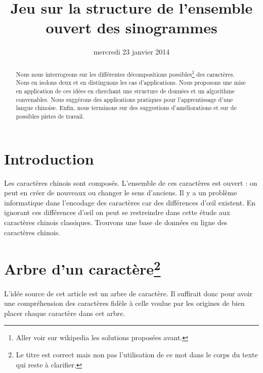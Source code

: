 \documentclass[12pt,onecolumn]{article} %
\title{Jeu sur la structure de l'ensemble ouvert des sinogrammes}
\author{}
\date{mercredi 23 janvier 2014}
\begin{document}
\maketitle

\begin{abstract}\par Nous nous interrogeons sur les différentes décompositions possibles\footnote{Aller voir sur wikipedia les solutions proposées avant.} des caractères. Nous en isolons deux et en distinguons les cas d'applications. Nous proposons une mise en application de ces idées en cherchant une structure de données et un algorithme convenables. Nous suggérons des applications pratiques pour l'apprentissage d'une langue chinoise. Enfin, nous terminons sur des suggestions d'améliorations et sur de possibles pistes de travail.
\end{abstract}

\tableofcontents

\section{Introduction}
Les caractères chinois sont composés. L'ensemble de ces caractères est ouvert : on peut en créer de nouveaux ou changer le sens d'anciens.
Il y a un problème informatique dans l'encodage des caractères car des différences d'œil existent. En ignorant ces différences d'œil on peut se restreindre dans cette étude aux caractères chinois classiques. Trouvons une base de données en ligne des caractères chinois.

\section{Arbre d'un caractère\footnote{Le titre est correct mais non pas l'utilisation de ce mot dans le corps du texte qui reste à clarifier.}}
L'idée source de cet article est un arbre de caractère. Il suffirait donc pour avoir une compréhension des caractères fidèle à celle voulue par les origines de bien placer chaque caractère dans cet arbre.
\end{document}
